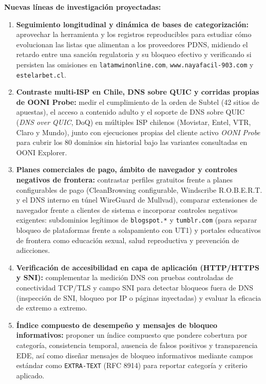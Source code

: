 \documentclass[10pt,a4paper]{article}
\begin{document}
\textbf{Nuevas líneas de investigación proyectadas:}
\begin{enumerate}[resume]
\item \textbf{Seguimiento longitudinal y dinámica de bases de categorización:} aprovechar la herramienta y los registros reproducibles para estudiar cómo evolucionan las listas que alimentan a los proveedores PDNS, midiendo el retardo entre una sanción regulatoria y su bloqueo efectivo y verificando si persisten las omisiones en \texttt{latamwinonline.com}, \texttt{www.nayafacil-903.com} y \texttt{estelarbet.cl}.
\item \textbf{Contraste multi-ISP en Chile, DNS sobre QUIC y corridas propias de OONI Probe:} medir el cumplimiento de la orden de Subtel (42 sitios de apuestas), el acceso a contenido adulto y el soporte de DNS sobre QUIC (\emph{DNS over QUIC}, DoQ) en múltiples ISP chilenos (Movistar, Entel, VTR, Claro y Mundo), junto con ejecuciones propias del cliente activo \emph{OONI Probe} para cubrir los 80 dominios sin historial bajo las variantes consultadas en OONI Explorer.
\item \textbf{Planes comerciales de pago, ámbito de navegador y controles negativos de frontera:} contrastar perfiles gratuitos frente a planes configurables de pago (CleanBrowsing configurable, Windscribe R.O.B.E.R.T. y el DNS interno en túnel WireGuard de Mullvad), comparar extensiones de navegador frente a clientes de sistema e incorporar controles negativos exigentes: subdominios legítimos de \texttt{blogspot.*} y \texttt{tumblr.com} (para separar bloqueo de plataformas frente a solapamiento con UT1) y portales educativos de frontera como educación sexual, salud reproductiva y prevención de adicciones.
\item \textbf{Verificación de accesibilidad en capa de aplicación (HTTP/HTTPS y SNI):} complementar la medición DNS con pruebas controladas de conectividad TCP/TLS y campo SNI para detectar bloqueos fuera de DNS (inspección de SNI, bloqueo por IP o páginas inyectadas) y evaluar la eficacia de extremo a extremo.
\item \textbf{Índice compuesto de desempeño y mensajes de bloqueo informativos:} proponer un índice compuesto que pondere cobertura por categoría, consistencia temporal, ausencia de falsos positivos y transparencia EDE, así como diseñar mensajes de bloqueo informativos mediante campos estándar como \texttt{EXTRA-TEXT} (RFC 8914) para reportar categoría y criterio aplicado.
\end{enumerate}

\begingroup
\footnotesize
\setlength{\parskip}{0pt}
{}


\endgroup
\end{document}
